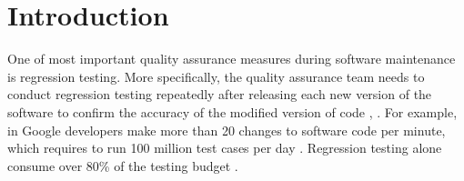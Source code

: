 \documentclass{sig-alternate}
\begin{document}

\section{Introduction}
One of most important quality assurance measures during software maintenance is regression testing. 
More specifically, the quality assurance team needs to conduct regression testing repeatedly after releasing each new version of the software to confirm the accuracy of the modified version of code \cite{junaid:clustering}, \cite{ozturk:quality}. 
For example, in Google developers make more than 20 changes to software code per minute, which requires to run 100 million test cases per day \cite{kumar:development}. Regression testing alone consume over 80\% of the testing budget \cite{hall:review}. 
\end{document}
